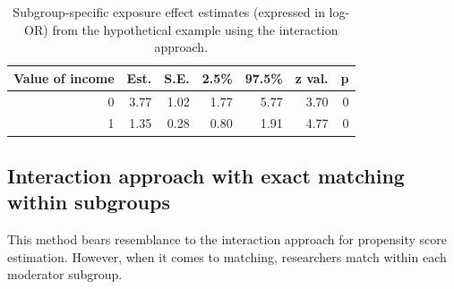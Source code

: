 \documentclass[
  letterpaper,
  DIV=11,
  numbers=noendperiod]{scrreprt}
\begin{document}
\hypertarget{tbl-int-approach-sep}{}
\begin{table}[!h]
\caption{\label{tbl-int-approach-sep}Subgroup-specific exposure effect estimates (expressed in log-OR) from
the hypothetical example using the interaction approach. }\tabularnewline

\centering
\begin{tabular}{rrrrrrr}
\toprule
Value of income & Est. & S.E. & 2.5\% & 97.5\% & z val. & p\\
\midrule
0 & 3.77 & 1.02 & 1.77 & 5.77 & 3.70 & 0\\
1 & 1.35 & 0.28 & 0.80 & 1.91 & 4.77 & 0\\
\bottomrule
\end{tabular}
\end{table}

\hypertarget{interaction-approach-with-exact-matching-within-subgroups}{%
\subsection{Interaction approach with exact matching within
subgroups}\label{interaction-approach-with-exact-matching-within-subgroups}}

This method bears resemblance to the interaction approach for propensity
score estimation. However, when it comes to matching, researchers match
within each moderator subgroup.
\end{document}
